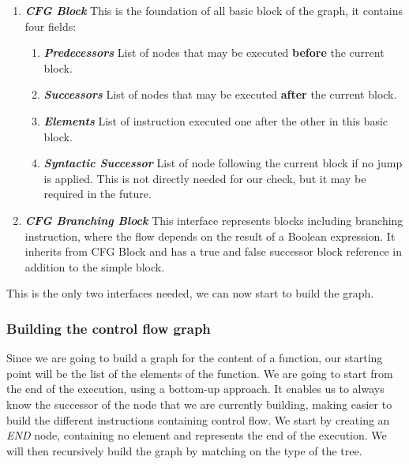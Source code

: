 \begin{enumerate}
	\item \textbf{\textit{CFG Block}} \newline 
	This is the foundation of all basic block of the graph, it contains four fields:
	\begin{enumerate}
		\item \textbf{\textit{Predecessors}} \newline
		List of nodes that may be executed \textbf{before} the current block.\newline
		\item \textbf{\textit{Successors}} \newline
		List of nodes that may be executed \textbf{after} the current block.\newline
		\item \textbf{\textit{Elements}} \newline
		List of instruction executed one after the other in this basic block. \newline
		\item \textbf{\textit{Syntactic Successor}} \newline
		List of node following the current block if no jump is applied. 
		This is not directly needed for our check, but it may be required in the future.\newline
	\end{enumerate}
	\item \textbf{\textit{CFG Branching Block}} \newline 
	This interface represents blocks including branching instruction, where the flow depends on the result of a Boolean expression. 
	It inherits from CFG Block and has a true and false successor block reference in addition to the simple block.
	\newline 
\end{enumerate}
This is the only two interfaces needed, we can now start to build the graph.

\subsubsection{Building the control flow graph}
\label{subsubsec:building_the_graph}
Since we are going to build a graph for the content of a function, our starting point will be the list of the elements of the function.
We are going to start from the end of the execution, using a bottom-up approach.
It enables us to always know the successor of the node that we are currently building, making easier to build the different instructions containing control flow.
We start by creating an \emph{END} node, containing no element and represents the end of the execution.
We will then recursively build the graph by matching on the type of the tree.

